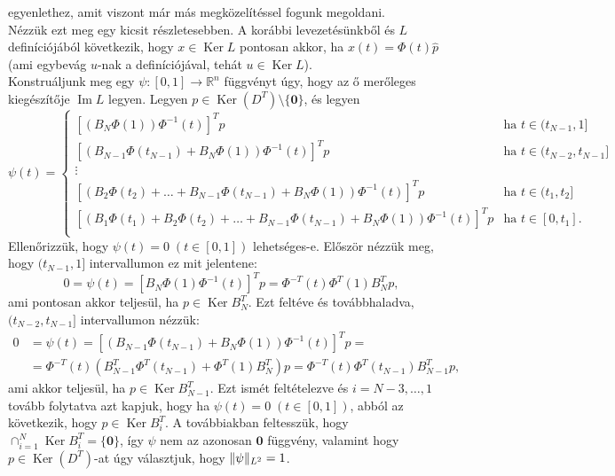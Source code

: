 \documentclass[oneside, titlepage, 12pt, a4paper]{report}
\DeclareMathOperator{\Ima}{Im}	%
\DeclareMathOperator{\Ker}{Ker}	%
\DeclarePairedDelimiter\norm{\lVert}{\rVert}	%
\begin{document}
egyenlethez, amit viszont már más megközelítéssel fogunk megoldani. \\
Nézzük ezt meg egy kicsit részletesebben. A korábbi levezetésünkből és $L$ definíciójából következik, hogy $x \in \Ker L$ pontosan akkor, ha $x(t) = \Phi(t) \hat{p}$ (ami egybevág $u$-nak a definíciójával, tehát $u \in \Ker L$). \\
Konstruáljunk meg egy $\psi : [0, 1] \rightarrow \mathbb{R}^n$ függvényt úgy, hogy az ő merőleges kiegészítője $\Ima L$ legyen. Legyen $p \in \Ker(D^T) \setminus \{ \mathbf{0} \}$, és legyen
\begin{equation*}
\psi(t) = 
	\begin{cases}
	\left[ \left( B_N \Phi(1) \right) \Phi^{-1}(t) \right]^T p &\text{ha } t \in (t_{N-1}, 1] \\
	\left[ \left( B_{N-1} \Phi(t_{N-1}) +  B_N \Phi(1) \right) \Phi^{-1}(t) \right]^T p &\text{ha } t \in (t_{N-2}, t_{N-1}]  \\
	\vdots &\\
	\left[ \left( B_2 \Phi(t_2) + \dots + B_{N-1} \Phi(t_{N-1}) +  B_N \Phi(1) \right) \Phi^{-1}(t) \right]^T p &\text{ha } t \in (t_1, t_2]  \\
	\left[ \left( B_1 \Phi(t_1) + B_2 \Phi(t_2) + \dots + B_{N-1} \Phi(t_{N-1}) +  B_N \Phi(1) \right) \Phi^{-1}(t) \right]^T p &\text{ha } t \in [0, t_1]. \\
	\end{cases}
\end{equation*}
Ellenőrizzük, hogy $\psi(t) = 0 \; (t \in [0, 1])$ lehetséges-e. Először nézzük meg, hogy $(t_{N-1}, 1]$ intervallumon ez mit jelentene:
\begin{equation*}
0 = \psi(t) = \left[ B_N \Phi(1) \Phi^{-1}(t) \right]^T p = \Phi^{-T}(t) \Phi^T(1) B_N^T p,
\end{equation*}
ami pontosan akkor teljesül, ha $p \in \Ker B_N^T$. Ezt feltéve és továbbhaladva, $(t_{N-2}, t_{N-1}]$ intervallumon nézzük:
\begin{align*}
0 &= \psi(t) = \left[ \left( B_{N-1} \Phi(t_{N-1}) + B_N \Phi(1) \right) \Phi^{-1}(t) \right]^T p =\\
 &= \Phi^{-T}(t) \left( B_{N-1}^T \Phi^T(t_{N-1}) + \Phi^T(1) B_N^T \right) p = \Phi^{-T}(t) \Phi^T(t_{N-1}) B_{N-1}^T p,
\end{align*}
ami akkor teljesül, ha $p \in \Ker B_{N-1}^T$. Ezt ismét feltételezve és $i = N-3, \dots, 1$ tovább folytatva azt kapjuk, hogy ha $\psi(t) = 0 \; (t \in [0, 1])$, abból az következik, hogy $p \in \Ker B_i^T$. A továbbiakban feltesszük, hogy $\cap_{i = 1}^N \Ker B_i^T = \{ \mathbf{0} \}$, így $\psi$ nem az azonosan $\mathbf{0}$ függvény, valamint hogy $p \in \Ker (D^T)$-at úgy választjuk, hogy $\norm{\psi}_{L^2} = 1$. \\
\end{document}
